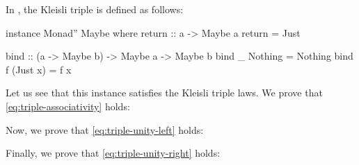 \begin{example}
  \label{ex:triple-maybe-haskell}

  In \hask, the  Kleisli triple is defined as
  follows:
  \begin{codehaskell}
instance Monad'' Maybe where
  return :: a -> Maybe a
  return = Just

  bind :: (a -> Maybe b) -> Maybe a -> Maybe b
  bind _ Nothing  = Nothing
  bind f (Just x) = f x
  \end{codehaskell}
  Let us see that this instance satisfies the Kleisli triple laws. We
  prove that \eqref{eq:triple-associativity} holds:

  \vspace{1em}
  \begin{steps}
  \end{steps}
  \begin{steps}
  \end{steps}
  Now, we prove that \eqref{eq:triple-unity-left} holds:
  \begin{steps}
  \end{steps}
  Finally, we prove that \eqref{eq:triple-unity-right} holds:

  \vspace{1em}
  \begin{steps}
  \end{steps}
  \begin{steps}
  \end{steps}

\end{example}

